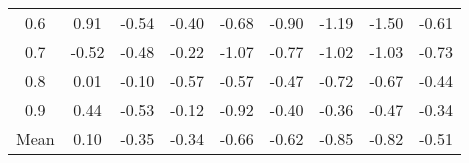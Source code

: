 \documentclass[11pt,a4paper]{report}
\begin{document}
\begin{longtable}{ | c || c | c | c | c | c | c | c || c |}
0.6 &  \cellcolor[HTML]{E7E7FF} 0.91 &  \cellcolor[HTML]{FFEFEF} -0.54 &  \cellcolor[HTML]{FFF7F7} -0.40 &  \cellcolor[HTML]{FFEFEF} -0.68 &  \cellcolor[HTML]{FFE7E7} -0.90 &  \cellcolor[HTML]{FFDFDF} -1.19 &  \cellcolor[HTML]{FFD7D7} -1.50 &  \cellcolor[HTML]{FFEFEF} -0.61 \\
0.7 &  \cellcolor[HTML]{FFEFEF} -0.52 &  \cellcolor[HTML]{FFEFEF} -0.48 &  \cellcolor[HTML]{FFF7F7} -0.22 &  \cellcolor[HTML]{FFE7E7} -1.07 &  \cellcolor[HTML]{FFEFEF} -0.77 &  \cellcolor[HTML]{FFE7E7} -1.02 &  \cellcolor[HTML]{FFE7E7} -1.03 &  \cellcolor[HTML]{FFEFEF} -0.73 \\
0.8 &  \cellcolor[HTML]{FFFFFF} 0.01 &  \cellcolor[HTML]{FFFFFF} -0.10 &  \cellcolor[HTML]{FFEFEF} -0.57 &  \cellcolor[HTML]{FFEFEF} -0.57 &  \cellcolor[HTML]{FFF7F7} -0.47 &  \cellcolor[HTML]{FFEFEF} -0.72 &  \cellcolor[HTML]{FFEFEF} -0.67 &  \cellcolor[HTML]{FFF7F7} -0.44 \\
0.9 &  \cellcolor[HTML]{F7F7FF} 0.44 &  \cellcolor[HTML]{FFEFEF} -0.53 &  \cellcolor[HTML]{FFFFFF} -0.12 &  \cellcolor[HTML]{FFE7E7} -0.92 &  \cellcolor[HTML]{FFF7F7} -0.40 &  \cellcolor[HTML]{FFF7F7} -0.36 &  \cellcolor[HTML]{FFF7F7} -0.47 &  \cellcolor[HTML]{FFF7F7} -0.34 \\
\hline
\hline
Mean  &  \cellcolor[HTML]{FFFFFF} 0.10 &  \cellcolor[HTML]{FFF7F7} -0.35 &  \cellcolor[HTML]{FFF7F7} -0.34 &  \cellcolor[HTML]{FFEFEF} -0.66 &  \cellcolor[HTML]{FFEFEF} -0.62 &  \cellcolor[HTML]{FFE7E7} -0.85 &  \cellcolor[HTML]{FFE7E7} -0.82 &  \cellcolor[HTML]{FFEFEF} -0.51 \\
\hline
\end{longtable}
\end{document}
